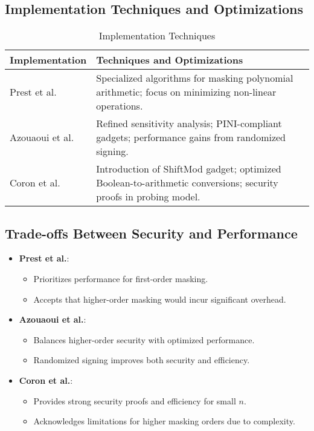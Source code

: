\subsection{Implementation Techniques and Optimizations}

\begin{table}[h]
    \centering
    \caption{Implementation Techniques}
    \begin{tabular}{l p{10cm}}
        \toprule
        \textbf{Implementation} & \textbf{Techniques and Optimizations}                                                                           \\
        \midrule
        Prest et al.\           & Specialized algorithms for masking polynomial arithmetic; focus on minimizing non-linear operations.            \\
        Azouaoui et al.\        & Refined sensitivity analysis; PINI-compliant gadgets; performance gains from randomized signing.                \\
        Coron et al.\           & Introduction of ShiftMod gadget; optimized Boolean-to-arithmetic conversions; security proofs in probing model. \\
        \bottomrule
    \end{tabular}
    \label{tab:implementation_techniques}
\end{table}

\subsection{Trade-offs Between Security and Performance}

\begin{itemize}
    \item \textbf{Prest et al.}:
          \begin{itemize}
              \item Prioritizes performance for first-order masking.
              \item Accepts that higher-order masking would incur significant overhead.
          \end{itemize}
    \item \textbf{Azouaoui et al.}:
          \begin{itemize}
              \item Balances higher-order security with optimized performance.
              \item Randomized signing improves both security and efficiency.
          \end{itemize}
    \item \textbf{Coron et al.}:
          \begin{itemize}
              \item Provides strong security proofs and efficiency for small $n$.
              \item Acknowledges limitations for higher masking orders due to complexity.
          \end{itemize}
\end{itemize}

